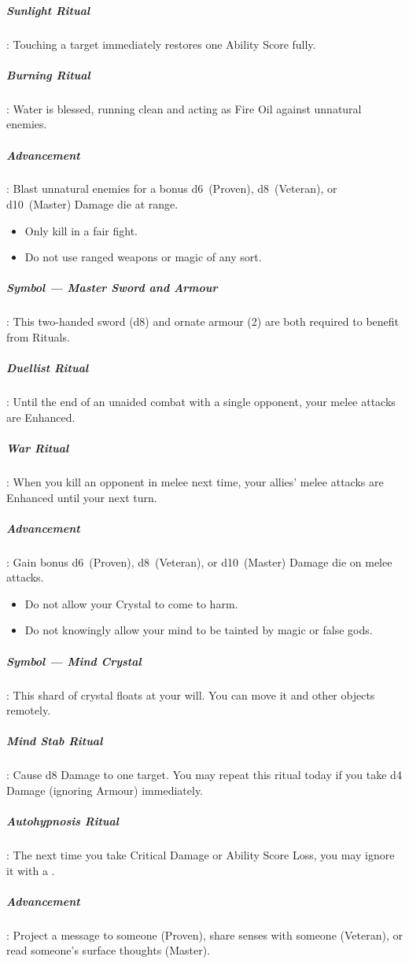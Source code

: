\documentclass[itdr]{subfiles}
\begin{document}
\subparagraph{Sunlight Ritual}: Touching a target immediately restores one Ability Score fully.

\subparagraph{Burning Ritual}: Water is blessed, running clean and acting as Fire Oil against unnatural enemies.

\subparagraph{Advancement}: Blast unnatural enemies for a bonus d6~(Proven), d8~(Veteran), or d10~(Master) Damage die at range.

\vfill
\break
{}

{\em\begin{itemize}
		\item Only kill in a fair fight.
		\item Do not use ranged weapons or magic of any sort.
\end{itemize}}

\subparagraph{Symbol --- Master Sword and Armour}: This two-handed sword (d8) and ornate armour (2) are both required to benefit from Rituals.

\subparagraph{Duellist Ritual}: Until the end of an unaided combat with a single opponent, your melee attacks are Enhanced.

\subparagraph{War Ritual}: When you kill an opponent in melee next time, your allies' melee attacks are Enhanced until your next turn.

\subparagraph{Advancement}: Gain bonus d6~(Proven), d8~(Veteran), or d10~(Master) Damage die on melee attacks.

\vspace{2ex}

{\em\begin{itemize}
		\item Do not allow your Crystal to come to harm.
		\item Do not knowingly allow your mind to be tainted by magic or false gods.
\end{itemize}}

\subparagraph{Symbol --- Mind Crystal}: This shard of crystal floats at your will. You can move it and other objects remotely.

\subparagraph{Mind Stab Ritual}: Cause d8 Damage to one target. You may repeat this ritual today if you take d4 Damage (ignoring Armour) immediately.

\subparagraph{Autohypnosis Ritual}: The next time you take Critical Damage or Ability Score Loss, you may ignore it with a .

\subparagraph{Advancement}: Project a message to someone (Proven), share senses with someone (Veteran), or read someone's surface thoughts (Master).
\end{document}
